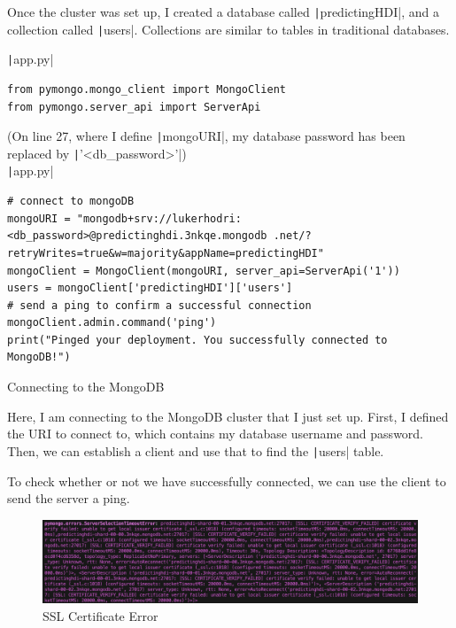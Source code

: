 \documentclass[12pt]{report}
\newcommand{\pil}[1]{\protect\texttt|#1|}
\begin{document}
Once the cluster was set up, I created a database called \pil{predictingHDI}, and a collection called \pil{users}. Collections are similar to tables in traditional databases.

\begin{listing}[H]
\pil{app.py}
\begin{verbatim}
from pymongo.mongo_client import MongoClient
from pymongo.server_api import ServerApi
\end{verbatim}
(On line 27, where I define \pil{mongoURI}, my database password has been replaced by \pil{'<db_password>'}) \\
\pil{app.py}
\begin{verbatim}
# connect to mongoDB
mongoURI = "mongodb+srv://lukerhodri:<db_password>@predictinghdi.3nkqe.mongodb .net/?retryWrites=true&w=majority&appName=predictingHDI"
mongoClient = MongoClient(mongoURI, server_api=ServerApi('1'))
users = mongoClient['predictingHDI']['users']
# send a ping to confirm a successful connection
mongoClient.admin.command('ping')
print("Pinged your deployment. You successfully connected to MongoDB!")
\end{verbatim}
\caption{Connecting to the MongoDB}\label{cs:connectMongo}
\end{listing}

Here, I am connecting to the MongoDB cluster that I just set up. First, I defined the URI to connect to, which contains my database username and password. Then, we can establish a client and use that to find the \pil{users} table.

To check whether or not we have successfully connected, we can use the client to send the server a ping.

\begin{figure}[H]
\centering
\includegraphics[width=14cm]{ss15.4.png}
\caption{SSL Certificate Error}\label{fig:ss15.4}
\end{figure}

\begin{center}
\end{center}
\end{document}
